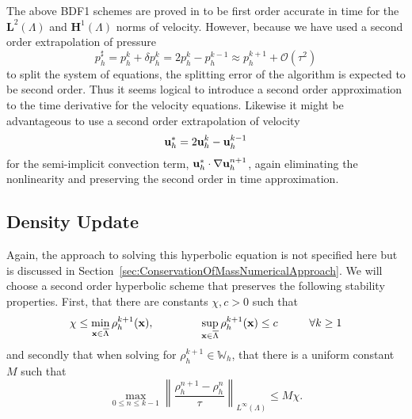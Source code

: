 \documentclass[letterpaper]{erdc}
\begin{document}
The above BDF1 schemes are proved in \cite{guermond2011error} to be first order accurate in time for the $\mathbf{L}^2(\Lambda)$ and $\mathbf{H}^1(\Lambda)$ norms of velocity.  However, because we have used a second order extrapolation of pressure
\begin{equation}
  p^{\sharp}_h = p_h^{k} + \delta p_h^{k} = 2p^{k}_h-p^{k-1}_h \approx p_h^{k+1} + \mathcal{O}\left(\tau^2 \right)
\end{equation}
to split the system of equations, the splitting error of the algorithm is expected to be second order.  Thus it seems logical to introduce a second order approximation to the time derivative for the velocity equations.  Likewise it might be advantageous to use a second order extrapolation of velocity 
\begin{equation}
  \textbf{u}^{*}_h = 2\textbf{u}_h^{k}  - \textbf{u}_h^{k-1}
\end{equation}
for the semi-implicit convection term, $\textbf{u}_h^{*}\cdot\nabla\textbf{u}_h^{n+1}$, again eliminating the nonlinearity and preserving the second order in time approximation.


%
%
\subsection{Density Update}
Again, the approach to solving this hyperbolic equation is not specified here but is discussed in Section~\ref{sec:ConservationOfMassNumericalApproach}.  We will choose a second order hyperbolic scheme that preserves the following stability properties.  First, that there are constants $\chi, c > 0$ such that 
\begin{equation}
  \chi \leq \displaystyle\min_{\textbf{x}\in\overline{\Lambda}} \rho_h^{k+1}(\textbf{x}),  \hspace{1.5cm} \displaystyle\sup_{\textbf{x}\in\overline{\Lambda}}\rho_h^{k+1}(\textbf{x}) \leq c \hspace{1cm} \forall k\geq 1
\end{equation}
and secondly that when solving for $\rho_h^{k+1}\in \mathbb{W}_h$, that there is a uniform constant $M$ such that
\begin{equation}
  \displaystyle\max_{0\leq n\leq k-1} \left \| \frac{\rho_h^{n+1} - \rho_h^{n}}{\tau}\right\|_{L^{\infty}(\Lambda)} \leq M\chi.
\end{equation}

%
%
\end{document}
